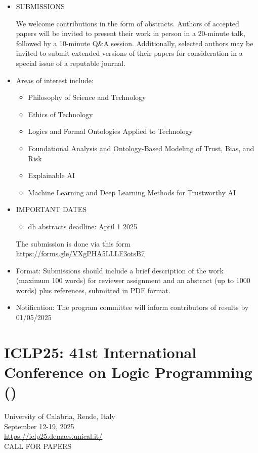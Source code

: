\documentclass[prodmode,acmtecs]{acmsmall} %
\begin{document}
\begin{itemize}
\item  SUBMISSIONS 
 
  We welcome contributions in the form of abstracts. Authors of accepted papers will be invited to present their work in person in a 20-minute talk, followed by a 10-minute Q\&A session. Additionally, selected authors may be invited to submit extended versions of their papers for consideration in a special issue of a reputable journal.  
 
\item  Areas of interest include:  
 
\begin{itemize}\item  Philosophy of Science and Technology 
\item  Ethics of Technology 
\item  Logics and Formal Ontologies Applied to Technology 
\item  Foundational Analysis and Ontology-Based Modeling of Trust, Bias, and Risk 
\item  Explainable AI 
\item  Machine Learning and Deep Learning Methods for Trustworthy AI  
\end{itemize} 
\item  IMPORTANT DATES 
 
\begin{itemize}\item  dh abstracts deadline: April 1 2025 
\end{itemize} 
  The submission is done via this form \href{https://forms.gle/VXgPHA5LLLF3otsB7}{https://forms.gle/VXgPHA5LLLF3otsB7}  
 
\item  Format: Submissions should include a brief description of the work (maximum 100 words) for reviewer assignment and an abstract (up to 1000 words) plus references, submitted in PDF format.  
 
\item  Notification: The program committee will inform contributors of results by 01/05/2025  
 
\end{itemize}\section{ICLP25: 41st International Conference on Logic Programming ()}\label{ICLP25}  University of Calabria, Rende, Italy \\ 
  September 12-19, 2025\\ 
  \href{https://iclp25.demacs.unical.it/}{https://iclp25.demacs.unical.it/}\\ 
CALL FOR PAPERS 
\end{document}
